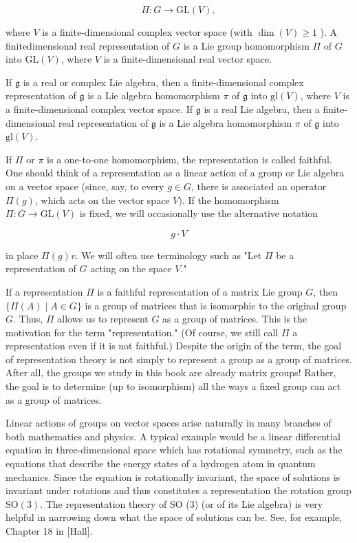 \documentclass[10pt, letterpaper]{article}
\begin{document}
$$
\Pi: G \rightarrow \mathrm{GL}(V),
$$

where $V$ is a finite-dimensional complex vector space (with $\operatorname{dim}(V) \geq 1$ ). A finitedimensional real representation of $G$ is a Lie group homomorphism $\Pi$ of $G$ into $\mathrm{GL}(V)$, where $V$ is a finite-dimensional real vector space.

If $\mathfrak{g}$ is a real or complex Lie algebra, then a finite-dimensional complex representation of $\mathfrak{g}$ is a Lie algebra homomorphism $\pi$ of $\mathfrak{g}$ into $\mathrm{gl}(V)$, where $V$ is a finite-dimensional complex vector space. If $\mathfrak{g}$ is a real Lie algebra, then a finite-dimensional real representation of $\mathfrak{g}$ is a Lie algebra homomorphism $\pi$ of $\mathfrak{g}$ into $\mathrm{gl}(V)$.

If $\Pi$ or $\pi$ is a one-to-one homomorphism, the representation is called faithful.\\
One should think of a representation as a linear action of a group or Lie algebra on a vector space (since, say, to every $g \in G$, there is associated an operator $\Pi(g)$, which acts on the vector space $V)$. If the homomorphism $\Pi: G \rightarrow \mathrm{GL}(V)$ is fixed, we will occasionally use the alternative notation

$$
g \cdot V
$$

in place $\Pi(g) v$. We will often use terminology such as "Let $\Pi$ be a representation of $G$ acting on the space $V$."

If a representation $\Pi$ is a faithful representation of a matrix Lie group $G$, then $\{\Pi(A) \mid A \in G\}$ is a group of matrices that is isomorphic to the original group $G$. Thus, $\Pi$ allows us to represent $G$ as a group of matrices. This is the motivation for the term "representation." (Of course, we still call $\Pi$ a representation even if it is not faithful.) Despite the origin of the term, the goal of representation theory is not simply to represent a group as a group of matrices. After all, the groups we study in this book are already matrix groups! Rather, the goal is to determine (up to isomorphism) all the ways a fixed group can act as a group of matrices.

Linear actions of groups on vector spaces arise naturally in many branches of both mathematics and physics. A typical example would be a linear differential equation in three-dimensional space which has rotational symmetry, such as the equations that describe the energy states of a hydrogen atom in quantum mechanics. Since the equation is rotationally invariant, the space of solutions is invariant under rotations and thus constitutes a representation the rotation group $\mathrm{SO}(3)$. The representation theory of SO (3) (or of its Lie algebra) is very helpful in narrowing down what the space of solutions can be. See, for example, Chapter 18 in [Hall].
\end{document}
